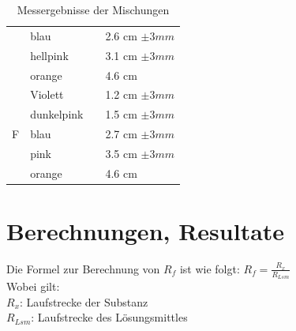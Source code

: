 \documentclass[11pt,paper=a4,final]{scrartcl}
\begin{document}
\begin{savenotes}
\begin{table}[ht!]
\begin{tabular}{|l|l|l|l|}
			& blau		&				& 2.6 cm \(\pm 3 mm \)	\\
      			& hellpink	& 				& 3.1 cm \(\pm 3 mm \)	\\
      			& orange	&				& 4.6 cm		\\ \cline{1-2} \cline{4-4}
      \multirow{5}{*}{F}
			& Violett	&				& 1.2 cm \(\pm 3 mm \)	\\
      			& dunkelpink 	&				& 1.5 cm \(\pm 3 mm \)	\\
      			& blau		& 				& 2.7 cm \(\pm 3 mm \)	\\
      			& pink		&				& 3.5 cm \(\pm 3 mm \)	\\
			& orange	&				& 4.6 cm 		\\ \hline

    \end{tabular}
    \caption{Messergebnisse der Mischungen}
  \end{table}
\end{savenotes}

\section{Berechnungen, Resultate}
Die Formel zur Berechnung von \(R_f\) ist wie folgt: \(R_f = \frac{R_x}{R_{Lsm}} \) \\
Wobei gilt:\\
\(R_x\): Laufstrecke der Substanz\\
\(R_{Lsm}\): Laufstrecke des L\"osungsmittles
\end{document}
